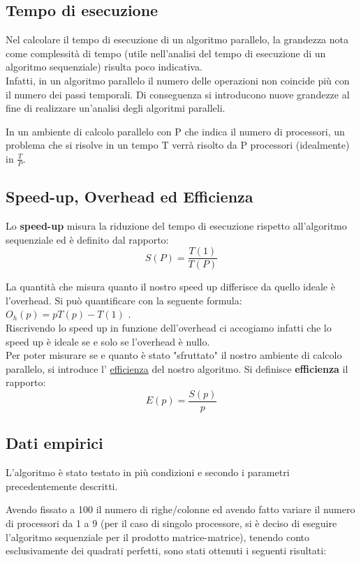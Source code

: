 \subsection{Tempo di esecuzione}

Nel calcolare il tempo di esecuzione di un algoritmo parallelo, la grandezza nota come complessità di tempo (utile nell'analisi del tempo di esecuzione di un algoritmo sequenziale) risulta poco indicativa.\\
Infatti, in un algoritmo parallelo il numero delle operazioni non coincide più con il numero dei passi temporali. Di conseguenza si introducono nuove grandezze al fine di realizzare un'analisi degli algoritmi paralleli.

In un ambiente di calcolo parallelo con P che indica il numero di processori, un problema che si risolve in un tempo T verrà risolto da P processori (idealmente) in $\frac{T}{P}$.


\subsection{Speed-up, Overhead ed Efficienza}

Lo \textbf{speed-up} misura la riduzione del tempo di esecuzione rispetto all'algoritmo sequenziale ed è definito dal rapporto:
$$ S(P) = \frac{T(1)}{T(P)} $$ 


La quantità che misura quanto il nostro speed up differisce da quello ideale è l'overhead. Si può quantificare con la seguente formula: $O_h(p) = pT(p) - T(1)$ .\\
Riscrivendo lo speed up in funzione dell'overhead ci accogiamo infatti che lo speed up è ideale se e solo se l'overhead è nullo.\\

Per poter misurare se e quanto è stato "sfruttato" il nostro ambiente di calcolo parallelo, si introduce l' \underline{efficienza} del nostro algoritmo.
Si definisce \textbf{efficienza} il rapporto: $$ E(p) = \frac{S(p)}{p} $$

\subsection{Dati empirici}
L'algoritmo è stato testato in più condizioni e secondo i parametri precedentemente descritti.

Avendo fissato a 100 il numero di righe/colonne ed avendo fatto variare il numero di processori da 1 a 9 (per il caso di singolo processore, si è deciso di eseguire l'algoritmo sequenziale per il prodotto matrice-matrice), tenendo conto esclusivamente dei quadrati perfetti, sono stati ottenuti i seguenti risultati:

